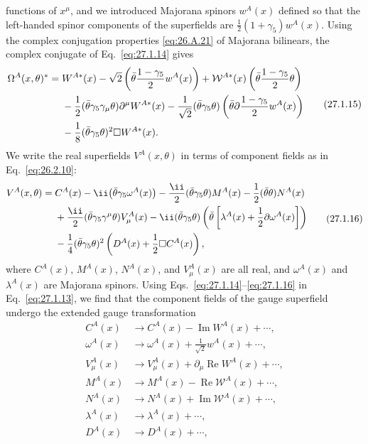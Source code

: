 functions of \(x^\mu\), and we introduced Majorana spinors \(w^A(x)\)
defined so that the left-handed spinor components of the superfields are
\(\tfrac12(1+\gamma_5)w^A(x)\). Using the complex conjugation properties
\eqref{eq:26.A.21} of Majorana bilinears, the complex conjugate of
Eq.~\eqref{eq:27.1.14} gives
\begin{equation}
  \begin{aligned}
  \Omega^A(x,\theta)^*={}&
  W^{A*}(x)
  -\sqrt{2}\left(
    \bar\theta\frac{1-\gamma_5}{2}w^A(x)
  \right)
  +\mathcal{W}^{A*}(x)\left(
    \bar\theta\frac{1-\gamma_5}{2}\theta
  \right)
  \\
  &-\frac12(\bar\theta\gamma_5\gamma_\mu\theta)
    \partial^\mu W^{A*}(x)
  -\frac1{\sqrt{2}}(\bar\theta\gamma_5\theta)
    \left(
      \bar\theta\sl{\partial}\frac{1-\gamma_5}{2}w^A(x)
    \right)
  \\
  &-\frac18(\bar\theta\gamma_5\theta)^2\Box W^{A*}(x).
  \end{aligned}
  \tag{27.1.15}\label{eq:27.1.15}
\end{equation}
We write the real superfields \(V^A(x,\theta)\) in terms of component
fields as in Eq.~\eqref{eq:26.2.10}:
\begin{equation}
  \begin{aligned}
  V^A(x,\theta)={}&C^A(x)
  -\ii\bigl(\bar\theta\gamma_5\omega^A(x)\bigr)
  -\frac{\ii}{2}(\bar\theta\gamma_5\theta)M^A(x)
  -\frac12(\bar\theta\theta)N^A(x)
  \\
  &+\frac{\ii}{2}(\bar\theta\gamma_5\gamma^\mu\theta)V^A_\mu(x)
  -\ii(\bar\theta\gamma_5\theta)
    \left(
      \bar\theta\left[\lambda^A(x)
      +\frac12\sl{\partial}\omega^A(x)\right]
    \right)
  \\
  &-\frac14(\bar\theta\gamma_5\theta)^2
    \left(D^A(x)+\frac12\Box C^A(x)\right),
  \end{aligned}
  \tag{27.1.16}\label{eq:27.1.16}
\end{equation}
where \(C^A(x)\), \(M^A(x)\), \(N^A(x)\), and \(V^A_\mu(x)\) are all
real, and \(\omega^A(x)\) and \(\lambda^A(x)\) are Majorana spinors.
Using Eqs.~\eqref{eq:27.1.14}--\eqref{eq:27.1.16} in
Eq.~\eqref{eq:27.1.13}, we find that the component fields of the gauge
superfield undergo the extended gauge transformation
\begin{equation}
  \begin{aligned}
  C^A(x)&\longrightarrow C^A(x)-\operatorname{Im}W^A(x)+\cdots,
  \\
  \omega^A(x)&\longrightarrow
    \omega^A(x)+\frac1{\sqrt{2}}w^A(x)+\cdots,
  \\
  V^A_\mu(x)&\longrightarrow
    V^A_\mu(x)+\partial_\mu\operatorname{Re}W^A(x)+\cdots,
  \\
  M^A(x)&\longrightarrow
    M^A(x)-\operatorname{Re}\mathcal{W}^A(x)+\cdots,
  \\
  N^A(x)&\longrightarrow
    N^A(x)+\operatorname{Im}\mathcal{W}^A(x)+\cdots,
  \\
  \lambda^A(x)&\longrightarrow\lambda^A(x)+\cdots,
  \\
  D^A(x)&\longrightarrow D^A(x)+\cdots,
  \end{aligned}
  \tag{27.1.17}\label{eq:27.1.17}
\end{equation}
